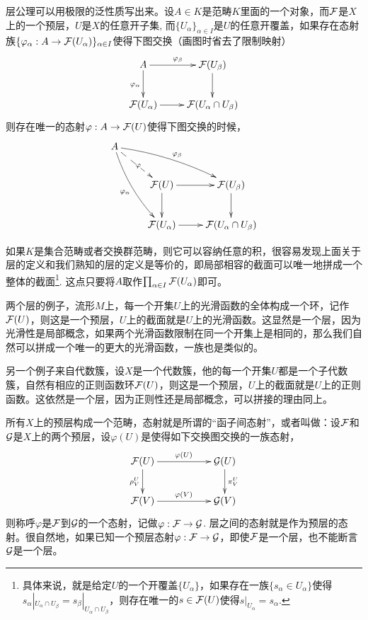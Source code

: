 层公理可以用极限的泛性质写出来。设$A\in K$是范畴$K$里面的一个对象，而$\mathcal{F}$是$X$上的一个预层，$U$是$X$的任意开子集, 而$\{U_\alpha\}_{\alpha\in I}$是$U$的任意开覆盖，如果存在态射族$\{\varphi_\alpha:A\to \mathcal{F}(U_\alpha)\}_{\alpha\in I}$使得下图交换（画图时省去了限制映射）
\[
	\xymatrix{
		A\ar[r]^{\varphi_{\beta}}\ar[d]_{\varphi_{\alpha}}&\calf(U_\beta)\ar[d]\\
		\calf(U_\alpha)\ar[r]&\calf(U_{\alpha}\cap U_{\beta})
	}
\]
则存在唯一的态射$\varphi:A\to \mathcal{F}(U)$使得下图交换的时候，
\[
	\xymatrix{
		A\ar@/_/[ddr]_{\varphi_{\alpha}}\ar@/^/[drr]^{\varphi_{\beta}}\ar@{-->}[dr]|{\varphi}&& \\
		&\calf(U)\ar[r]\ar[d]&\calf(U_\beta)\ar[d]\\
		&\calf(U_\alpha)\ar[r]&\calf(U_{\alpha}\cap U_{\beta})
	}
\]

如果$K$是集合范畴或者交换群范畴，则它可以容纳任意的积，很容易发现上面关于层的定义和我们熟知的层的定义是等价的，即局部相容的截面可以唯一地拼成一个整体的截面\footnote{具体来说，就是给定$U$的一个开覆盖$\{U_\alpha\}$，如果存在一族$\{s_\alpha\in U_\alpha\}$使得$s_\alpha|_{U_\alpha\cap U_\beta}=s_\beta|_{U_\alpha\cap U_\beta}$，则存在唯一的$s\in \mathcal{F}(U)$使得$s|_{U_\alpha}=s_\alpha$.}. 这点只要将$A$取作$\prod_{\alpha\in I}\mathcal{F}(U_\alpha)$即可。

\begin{para}
两个层的例子，流形$M$上，每一个开集$U$上的光滑函数的全体构成一个环，记作$\mathcal{F}(U)$，则这是一个预层，$U$上的截面就是$U$上的光滑函数。这显然是一个层，因为光滑性是局部概念，如果两个光滑函数限制在同一个开集上是相同的，那么我们自然可以拼成一个唯一的更大的光滑函数，一族也是类似的。

另一个例子来自代数簇，设$X$是一个代数簇，他的每一个开集$U$都是一个子代数簇，自然有相应的正则函数环$\mathcal{F}(U)$，则这是一个预层，$U$上的截面就是$U$上的正则函数。这依然是一个层，因为正则性还是局部概念，可以拼接的理由同上。
\end{para}

\begin{para}
所有$X$上的预层构成一个范畴，态射就是所谓的“函子间态射”，或者叫做：设$\mathcal{F}$和$\mathcal{G}$是$X$上的两个预层，设$\varphi(U)$是使得如下交换图交换的一族态射，
\[
	\xymatrix{
		\calf(U)\ar[rr]^{\varphi(U)} \ar[d]_{\rho^U_V}&&\calg(U) \ar[d]^{\pi^U_V}\\
		\calf(V)\ar[rr]^{\varphi(V)}&&\calg(V)
	}
\]
则称呼$\varphi$是$\mathcal{F}$到$\mathcal{G}$的一个态射，记做$\varphi:\mathcal{F}\to\mathcal{G}$. 层之间的态射就是作为预层的态射。很自然地，如果已知一个预层态射$\varphi:\mathcal{F}\to\mathcal{G}$，即使$\mathcal{F}$是一个层，也不能断言$\mathcal{G}$是一个层。
\end{para}

